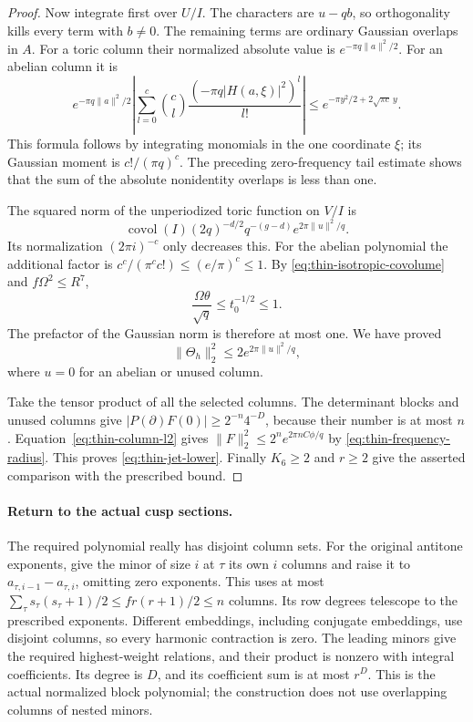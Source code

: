 \begin{proof}
Now integrate first over $U/I$.  The characters are
$u-qb$, so orthogonality kills every term with $b\ne0$.
The remaining terms are ordinary Gaussian overlaps in $A$.
For a toric column their normalized absolute value is
$e^{-\pi q\|a\|^2/2}$.  For an abelian column it is
\[
 e^{-\pi q\|a\|^2/2}
       \left|\sum_{l=0}^c\binom cl
              \frac{(-\pi q|H(a,\xi)|^2)^l}{l!}\right|
 \le e^{-\pi y^2/2+2\sqrt{\pi c}\,y}.
\]
This formula follows by integrating monomials in the one
coordinate $\xi$; its Gaussian moment is
$c!/(\pi q)^c$.  The preceding zero-frequency tail estimate
shows that the sum of the absolute nonidentity overlaps is
less than one.

The squared norm of the unperiodized toric function on $V/I$ is
\[
 \operatorname{covol}(I)(2q)^{-d/2}q^{-(g-d)}
                         e^{2\pi\|u\|^2/q}.
\]
Its normalization $(2\pi i)^{-c}$ only decreases this.
For the abelian polynomial the additional factor is
$c^c/(\pi^c c!)\le(e/\pi)^c\le1$.
By \eqref{eq:thin-isotropic-covolume} and $f\Omega^2\le R^7$,
\[
 \frac{\Omega\theta}{\sqrt q}\le t_0^{-1/2}\le1.
\]
The prefactor of the Gaussian norm is therefore at most one.
We have proved
\begin{equation}\label{eq:thin-column-l2}
                  \|\Theta_h\|_2^2
                           \le2e^{2\pi\|u\|^2/q},
\end{equation}
where $u=0$ for an abelian or unused column.

Take the tensor product of all the selected columns.  The
determinant blocks and unused columns give
$|P(\partial)F(0)|\ge2^{-n}4^{-D}$, because their number is at
most $n$.  Equation~\eqref{eq:thin-column-l2} gives
$\|F\|_2^2\le2^n e^{2\pi nC\phi/q}$ by
\eqref{eq:thin-frequency-radius}.  This proves
\eqref{eq:thin-jet-lower}.  Finally $K_6\ge2$ and $r\ge2$
give the asserted comparison with the prescribed bound.
\end{proof}

\paragraph{Return to the actual cusp sections.}
The required polynomial really has disjoint column sets.  For
the original antitone exponents, give the minor of size $i$ at
$\tau$ its own $i$ columns and raise it to
$a_{\tau,i-1}-a_{\tau,i}$, omitting zero exponents.  This uses at
most
$\sum_\tau s_\tau(s_\tau+1)/2\le fr(r+1)/2\le n$ columns.
Its row degrees telescope to the prescribed exponents.  Different
embeddings, including conjugate embeddings, use disjoint columns,
so every harmonic contraction is zero.  The leading minors give
the required highest-weight relations, and their product is
nonzero with integral coefficients.  Its degree is $D$, and its
coefficient sum is at most $r^D$.  This is the actual normalized
block polynomial; the construction does not use overlapping
columns of nested minors.

